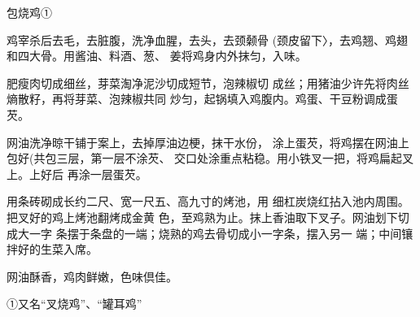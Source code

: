 \begin{recipe}{包烧鸡①}

\ingredients



\cooking

\step 鸡宰杀后去毛，去脏腹，洗净血腥，去头，去颈颡骨 (颈皮留下〉，去鸡翘、鸡翅和四大骨。用酱油、料酒、葱、 姜将鸡身内外抹匀，入味。

\step 肥瘦肉切成细丝，芽菜淘净泥沙切成短节，泡辣椒切 成丝；用猪油少许先将肉丝熵散籽，再将芽菜、泡辣椒共同 炒匀，起锅填入鸡腹内。鸡蛋、干豆粉调成蛋芡。

\step 网油洗净晾干铺于案上，去掉厚油边梗，抹干水份， 涂上蛋芡，将鸡摆在网油上包好(共包三层，第一层不涂芡、 交口处涂重点粘稳。用小铁叉一把，将鸡扁起叉上。上好后 再涂一层蛋芡。

\step 用条砖砌成长约二尺、宽一尺五、高九寸的烤池，用 细杠炭烧红拈入池内周围。把叉好的鸡上烤池翻烤成金黄 色，至鸡熟为止。抹上香油取下叉子。网油划下切成大一字 条摆于条盘的一端；烧熟的鸡去骨切成小一字条，摆入另一 端；中间镶拌好的生菜入席。

\notes

网油酥香，鸡肉鲜嫩，色味倶佳。

①又名“叉烧鸡”、“罐耳鸡”

\end{recipe}

